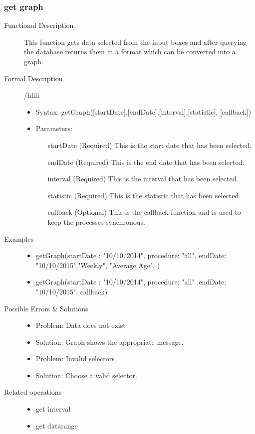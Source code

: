 \documentclass[a4paper]{article}
\begin{document}
\subsubsection{get graph}

\begin{description}
\item[Functional Description] This function gets data selected from the input boxes and after querying the database returns them in a format which can be converted into a graph.
\item[Formal Description]/hfill
\begin{itemize}
	\item Syntax: getGraph([startDate],[endDate],[interval],[statistic], [callback])\\
	\item Parameters:
		\begin{itemize}
			\item [startDate](Required) This is the start date that has been selected.
			\item [endDate](Required) This is the end date that has been selected.
			\item [interval](Required) This is the interval that has been selected.
			\item [statistic](Required) This is the statistic that has been selected.
			\item [callback](Optional) This is the callback function and is used to keep the processes synchronous.
		\end{itemize}
\end{itemize}
\item[Examples]\hfill
\begin{itemize}
	\item getGraph({startDate : "10/10/2014", procedure: "all", endDate: "10/10/2015"},"Weekly", "Average Age", )
	\item getGraph({startDate : "10/10/2014", procedure: "all" ,endDate: "10/10/2015"}, callback)
\end{itemize}
\item[Possible Errors \& Solutions]
\begin{itemize}
	\item Problem: Data does not exist
	\item Solution: Graph shows the appropriate message.
	\item Problem: Invalid selectors
	\item Solution: Choose a valid selector.
\end{itemize}
\item[Related operations] \hfill
\begin{itemize}
	\item get interval
	\item get datarange
\end{itemize}
\end{description}
\end{document}

